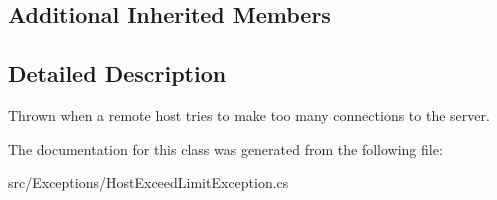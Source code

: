 \subsection*{Additional Inherited Members}


\subsection{Detailed Description}
Thrown when a remote host tries to make too many connections to the server. 

The documentation for this class was generated from the following file\-:\begin{DoxyCompactItemize}
\item 
src/\-Exceptions/Host\-Exceed\-Limit\-Exception.\-cs\end{DoxyCompactItemize}
